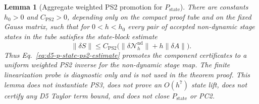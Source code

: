 \documentclass[preprint,12pt]{elsarticle}
\newtheorem{lemma}{Lemma}
\begin{document}
\begin{lemma}[Aggregate weighted PS2 promotion for \(P_{\mathrm{state}}\)]
\label{lem:d5-p-state-ps2-aggregate-promotion}
There are constants \(h_0>0\) and \(C_{\mathrm{PS2}}>0\), depending only on
the compact proof tube and on the fixed Gauss matrix, such that for
\(0<h<h_0\) every pair of accepted non-dynamic stage states in the tube
satisfies the state-block estimate
\begin{equation}
\label{eq:d5-p-state-ps2-estimate}
  \|\delta S\|\le C_{\mathrm{PS2}}
  \bigl(\|\delta\mathcal N_h^{\mathrm{nd}}\|+h\|\delta A\|\bigr).
\end{equation}
Thus Eq.~\eqref{eq:d5-p-state-ps2-estimate} promotes the component certificates to a uniform weighted PS2 inverse for
the non-dynamic stage map.  The finite linearization probe is diagnostic only
and is not used in the theorem proof.  This lemma does not instantiate PS3,
does not prove an \(O(h^7)\) state lift, does not certify any D5 Taylor term
bound, and does not close \(P_{\mathrm{state}}\) or PC2.
\end{lemma}
\end{document}
